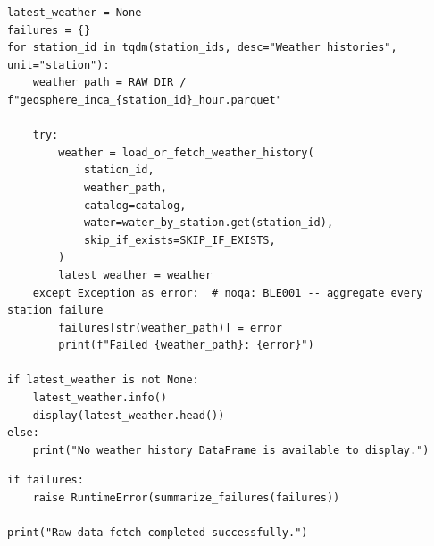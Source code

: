 \begin{verbatim}
latest_weather = None
failures = {}
for station_id in tqdm(station_ids, desc="Weather histories", unit="station"):
    weather_path = RAW_DIR / f"geosphere_inca_{station_id}_hour.parquet"

    try:
        weather = load_or_fetch_weather_history(
            station_id,
            weather_path,
            catalog=catalog,
            water=water_by_station.get(station_id),
            skip_if_exists=SKIP_IF_EXISTS,
        )
        latest_weather = weather
    except Exception as error:  # noqa: BLE001 -- aggregate every station failure
        failures[str(weather_path)] = error
        print(f"Failed {weather_path}: {error}")

if latest_weather is not None:
    latest_weather.info()
    display(latest_weather.head())
else:
    print("No weather history DataFrame is available to display.")
\end{verbatim}

\begin{verbatim}
if failures:
    raise RuntimeError(summarize_failures(failures))

print("Raw-data fetch completed successfully.")
\end{verbatim}
